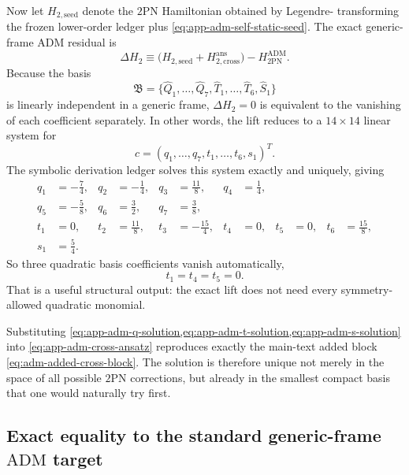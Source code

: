 \documentclass[11pt]{article}
\newcommand{\TwoPN}{\mathrm{2PN}}
\newcommand{\ADM}{\mathrm{ADM}}
\begin{document}
Now let \(H_{2,\mathrm{seed}}\) denote the \(\TwoPN\) Hamiltonian obtained by Legendre-
transforming the frozen lower-order ledger plus
\cref{eq:app-adm-self-static-seed}.  The exact generic-frame \(\ADM\) residual is
\begin{equation}
\Delta H_2
\equiv
\bigl(H_{2,\mathrm{seed}}+H_{2,\mathrm{cross}}^{\mathrm{ans}}\bigr)
-H_{2\mathrm{PN}}^{\ADM}.
\label{eq:app-adm-residual-def}
\end{equation}
Because the basis
\begin{equation}
\mathfrak B
=\{\widehat Q_1,\ldots,\widehat Q_7,\widehat T_1,\ldots,\widehat T_6,\widehat S_1\}
\label{eq:app-adm-ordered-basis}
\end{equation}
is linearly independent in a generic frame, \(\Delta H_2=0\) is equivalent to the
vanishing of each coefficient separately.  In other words, the lift reduces to a
\(14\times 14\) linear system for
\begin{equation}
c=(q_1,\ldots,q_7,t_1,\ldots,t_6,s_1)^T.
\label{eq:app-adm-c-vector}
\end{equation}
The symbolic derivation ledger solves this system exactly and uniquely, giving
\begin{align}
q_1&=-\frac74,
& q_2&=-\frac14,
& q_3&=\frac{11}{8},
& q_4&=\frac14,
\nonumber\\
q_5&=-\frac58,
& q_6&=\frac32,
& q_7&=\frac38,
\label{eq:app-adm-q-solution}
\\[0.5ex]
t_1&=0,
& t_2&=\frac{11}{8},
& t_3&=-\frac{15}{4},
& t_4&=0,
& t_5&=0,
& t_6&=\frac{15}{8},
\label{eq:app-adm-t-solution}
\\[0.5ex]
s_1&=\frac54.
\label{eq:app-adm-s-solution}
\end{align}
So three quadratic basis coefficients vanish automatically,
\begin{equation}
t_1=t_4=t_5=0.
\label{eq:app-adm-vanishing-ts}
\end{equation}
That is a useful structural output: the exact lift does not need every symmetry-allowed
quadratic monomial.

Substituting \cref{eq:app-adm-q-solution,eq:app-adm-t-solution,eq:app-adm-s-solution}
into \cref{eq:app-adm-cross-ansatz} reproduces exactly the main-text added block
\cref{eq:adm-added-cross-block}.  The solution is therefore unique not merely in the
space of all possible \(\TwoPN\) corrections, but already in the smallest compact basis
that one would naturally try first.

\subsection{Exact equality to the standard generic-frame \texorpdfstring{$\ADM$}{ADM} target}
\label{app:adm-match-details}
\end{document}
